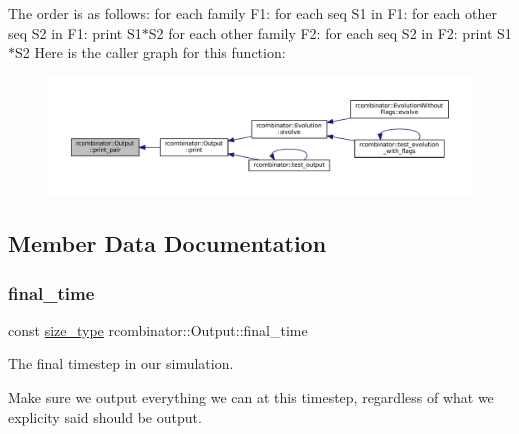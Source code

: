 The order is as follows\+: for each family F1\+: for each seq S1 in F1\+: for each other seq S2 in F1\+: print S1$\ast$\+S2 for each other family F2\+: for each seq S2 in F2\+: print S1$\ast$\+S2 Here is the caller graph for this function\+:
\nopagebreak
\begin{figure}[H]
\begin{center}
\leavevmode
\includegraphics[width=350pt]{classrcombinator_1_1Output_ac5632b57357788ba7d25769c412a2a11_icgraph}
\end{center}
\end{figure}


\subsection{Member Data Documentation}
\mbox{\label{classrcombinator_1_1Output_a6cb6e4bce4969d70ef39bfd35cea199e}} 
\subsubsection{\texorpdfstring{final\+\_\+time}{final\_time}}
{\footnotesize\ttfamily const \mbox{\hyperlink{constants_8h_abcd18a5521fc90ff6e7b00e4fee98397}{size\+\_\+type}} rcombinator\+::\+Output\+::final\+\_\+time\hspace{0.3cm}{\ttfamily [private]}}



The final timestep in our simulation. 

Make sure we output everything we can at this timestep, regardless of what we explicity said should be output. \mbox{\label{classrcombinator_1_1Output_a3a6c324b3e90823eb1a78b2af5f7b2b5}} 
